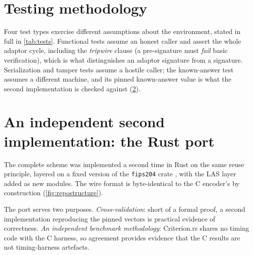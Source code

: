 \section{Testing methodology}
\label{sec:testing}

Four test types exercise different assumptions about the environment, stated in
full in \cref{tab:tests}. Functional tests assume an honest caller and assert the whole
adaptor cycle, including the \emph{tripwire} clause (a pre-signature must \emph{fail}
basic verification), which is what distinguishes an adaptor signature from a signature.
Serialization and tamper tests assume a hostile caller; the known-answer test assumes a
different machine, and its pinned known-answer value is what the second implementation is checked against
(\cref{sec:rustport}).

\section{An independent second implementation: the Rust port}
\label{sec:rustport}

The complete scheme was implemented a second time in Rust on the same reuse principle,
layered on a fixed version of the \texttt{fips204} crate \cite{fips204crate}, with the LAS
layer added as new modules. The wire format is byte-identical to the C encoder's by
construction (\cref{fig:repostructure}).


The port serves two purposes. \emph{Cross-validation}: short of a formal proof, a second
implementation reproducing the pinned vectors is practical evidence of correctness. \emph{An independent
benchmark methodology}: Criterion.rs \cite{criterionrs} shares no timing code with the C
harness, so agreement provides evidence that the C results are not timing-harness
artefacts.

